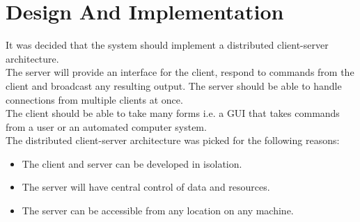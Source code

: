 \chapter{Design And Implementation}

It was decided that the system should implement a distributed client-server architecture.\\

The server will provide an interface for the client, respond to commands from the client and broadcast any resulting output. The server should be able to handle connections from  multiple clients at once.\\ 

The client should be able to take many forms i.e. a GUI that takes commands from a user or an automated computer system.\\

The distributed client-server architecture was picked for the following reasons:

	\begin{itemize}
		\item The client and server can be developed in isolation.
		\item The server will have central control of data and resources.
		\item The server can be accessible from any location on any machine.
	\end{itemize}
	
	
	